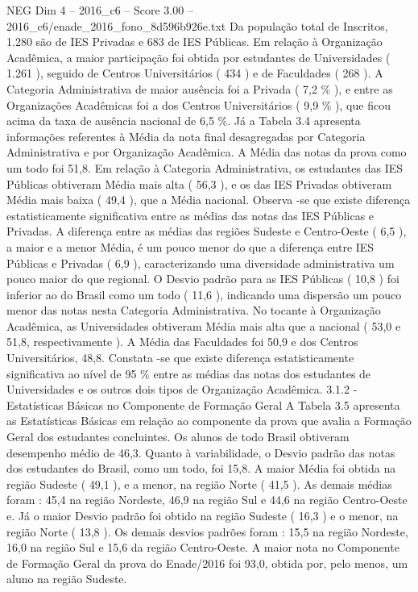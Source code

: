 \begin{textsample}{NEG Dim 4 – 2016\_c6 – Score 3.00 – 2016\_c6/enade\_2016\_fono\_8d596b926e.txt}
Da população total de Inscritos, 1.280 são de IES Privadas e 683 de IES Públicas.
Em relação à Organização Acadêmica, a maior participação foi obtida por estudantes de Universidades ( 1.261 ), seguido de Centros Universitários ( 434 ) e de Faculdades ( 268 ).
A Categoria Administrativa de maior ausência foi a Privada ( 7,2 \% ), e entre as Organizações Acadêmicas foi a dos Centros Universitários ( 9,9 \% ), que ficou acima da taxa de ausência nacional de 6,5 \%.
Já a Tabela 3.4 apresenta informações referentes à Média da nota final desagregadas por Categoria Administrativa e por Organização Acadêmica.
A Média das notas da prova como um todo foi 51,8.
Em relação à Categoria Administrativa, os estudantes das IES Públicas obtiveram Média mais alta ( 56,3 ), e os das IES Privadas obtiveram Média mais baixa ( 49,4 ), que a Média nacional.
Observa -se que existe diferença estatisticamente significativa entre as médias das notas das IES Públicas e Privadas.
A diferença entre as médias das regiões Sudeste e Centro-Oeste ( 6,5 ), a maior e a menor Média, é um pouco menor do que a diferença entre IES Públicas e Privadas ( 6,9 ), caracterizando uma diversidade administrativa um pouco maior do que regional.
O Desvio padrão para as IES Públicas ( 10,8 ) foi inferior ao do Brasil como um todo ( 11,6 ), indicando uma dispersão um pouco menor das notas nesta Categoria Administrativa.
No tocante à Organização Acadêmica, as Universidades obtiveram Média mais alta que a nacional ( 53,0 e 51,8, respectivamente ).
A Média das Faculdades foi 50,9 e dos Centros Universitários, 48,8.
Constata -se que existe diferença estatisticamente significativa ao nível de 95 \% entre as médias das notas dos estudantes de Universidades e os outros dois tipos de Organização Acadêmica. 3.1.2 - Estatísticas Básicas no Componente de Formação Geral A Tabela 3.5 apresenta as Estatísticas Básicas em relação ao componente da prova que avalia a Formação Geral dos estudantes concluintes.
Os alunos de todo Brasil obtiveram desempenho médio de 46,3.
Quanto à variabilidade, o Desvio padrão das notas dos estudantes do Brasil, como um todo, foi 15,8.
A maior Média foi obtida na região Sudeste ( 49,1 ), e a menor, na região Norte ( 41,5 ).
As demais médias foram : 45,4 na região Nordeste, 46,9 na região Sul e 44,6 na região Centro-Oeste e.
Já o maior Desvio padrão foi obtido na região Sudeste ( 16,3 ) e o menor, na região Norte ( 13,8 ).
Os demais desvios padrões foram : 15,5 na região Nordeste, 16,0 na região Sul e 15,6 da região Centro-Oeste.
A maior nota no Componente de Formação Geral da prova do Enade/2016 foi 93,0, obtida por, pelo menos, um aluno na região Sudeste.

\end{textsample}
